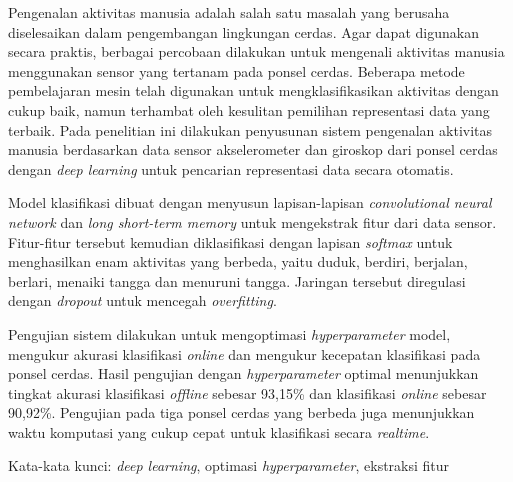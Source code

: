 \begin{abstractind}
    Pengenalan aktivitas manusia adalah salah satu masalah yang berusaha diselesaikan dalam pengembangan lingkungan cerdas. Agar dapat digunakan secara praktis, berbagai percobaan dilakukan untuk mengenali aktivitas manusia menggunakan sensor yang tertanam pada ponsel cerdas. Beberapa metode pembelajaran mesin telah digunakan untuk mengklasifikasikan aktivitas dengan cukup baik, namun terhambat oleh kesulitan pemilihan representasi data yang terbaik. Pada penelitian ini dilakukan penyusunan sistem pengenalan aktivitas manusia berdasarkan data sensor akselerometer dan giroskop dari ponsel cerdas dengan \textit{deep learning} untuk pencarian representasi data secara otomatis.

    Model klasifikasi dibuat dengan menyusun lapisan-lapisan \textit{convolutional neural network} dan \textit{long short-term memory} untuk mengekstrak fitur dari data sensor. Fitur-fitur tersebut kemudian diklasifikasi dengan lapisan \textit{softmax} untuk menghasilkan enam aktivitas yang berbeda, yaitu duduk, berdiri, berjalan, berlari, menaiki tangga dan menuruni tangga. Jaringan tersebut diregulasi dengan \textit{dropout} untuk mencegah \textit{overfitting}.

    Pengujian sistem dilakukan untuk mengoptimasi \textit{hyperparameter} model, mengukur akurasi klasifikasi \textit{online} dan mengukur kecepatan klasifikasi pada ponsel cerdas. Hasil pengujian dengan \textit{hyperparameter} optimal menunjukkan tingkat akurasi klasifikasi \textit{offline} sebesar 93,15\% dan klasifikasi \textit{online} sebesar 90,92\%. Pengujian pada tiga ponsel cerdas yang berbeda juga menunjukkan waktu komputasi yang cukup cepat untuk klasifikasi secara \textit{realtime}.

    \bigskip
    Kata-kata kunci: \textit{deep learning}, optimasi \textit{hyperparameter}, ekstraksi fitur
\end{abstractind}

